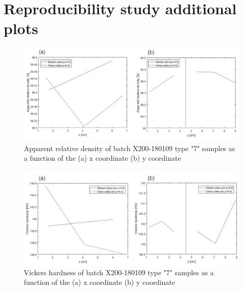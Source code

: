 
\chapter{Reproducibility study additional plots} %

\label{AppendixD} %

\begin{figure}[ht]
\centering
\centerline{\includegraphics[scale=0.55]{Images/180109-7Dxy}}
\decoRule
\caption[Average apparent relative density of batch X200-180109 type "7" samples as a function of the (a) x coordinate (b) y coordinate]{Apparent relative density of batch X200-180109 type "7" samples as a function of the (a) x coordinate (b) y coordinate}
\label{180109-7Dxy}
\end{figure} 

\begin{figure}[ht]
\centering
\centerline{\includegraphics[scale=0.55]{Images/180109-7Hxy}}
\decoRule
\caption[Average Vickers hardness of batch X200-180109 type "7" samples as a function of the (a) x coordinate (b) y coordinate]{Vickers hardness of batch X200-180109 type "7" samples as a function of the (a) x coordinate (b) y coordinate}
\label{180109-7Hxy}
\end{figure} 

